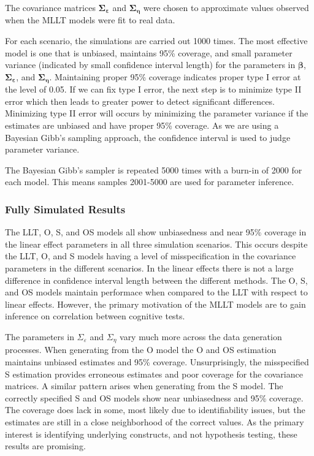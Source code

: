 \documentclass[
]{article}
\begin{document}
The covariance matrices \(\boldsymbol{\Sigma_\varepsilon}\) and \(\boldsymbol{\Sigma_\eta}\) were chosen to approximate values observed when the MLLT models were fit to real data.

For each scenario, the simulations are carried out 1000 times. The most effective model is one that is unbiased, maintains 95\% coverage, and small parameter variance (indicated by small confidence interval length) for the parameters in \(\boldsymbol{\beta}\), \(\boldsymbol{\Sigma_\varepsilon}\), and \(\boldsymbol{\Sigma_\eta}\). Maintaining proper 95\% coverage indicates proper type I error at the level of 0.05. If we can fix type I error, the next step is to minimize type II error which then leads to greater power to detect significant differences. Minimizing type II error will occurs by minimizing the parameter variance if the estimates are unbiased and have proper 95\% coverage. As we are using a Bayesian Gibb's sampling approach, the confidence interval is used to judge parameter variance.

The Bayesian Gibb's sampler is repeated 5000 times with a burn-in of 2000 for each model. This means samples 2001-5000 are used for parameter inference.

\hypertarget{fully-simulated-results}{%
\subsubsection{Fully Simulated Results}\label{fully-simulated-results}}

The LLT, O, S, and OS models all show unbiasedness and near 95\% coverage in the linear effect parameters in all three simulation scenarios. This occurs despite the LLT, O, and S models having a level of misspecification in the covariance parameters in the different scenarios. In the linear effects there is not a large difference in confidence interval length between the different methods. The O, S, and OS models maintain performace when compared to the LLT with respect to linear effects. However, the primary motivation of the MLLT models are to gain inference on correlation between cognitive tests.

The parameters in \(\Sigma_\varepsilon\) and \(\Sigma_\eta\) vary much more across the data generation processes. When generating from the O model the O and OS estimation maintains unbiased estimates and 95\% coverage. Unsurprisingly, the misspecified S estimation provides erroneous estimates and poor coverage for the covariance matrices. A similar pattern arises when generating from the S model. The correctly specified S and OS models show near unbiasedness and 95\% coverage. The coverage does lack in some, most likely due to identifiability issues, but the estimates are still in a close neighborhood of the correct values. As the primary interest is identifying underlying constructs, and not hypothesis testing, these results are promising.
\end{document}
